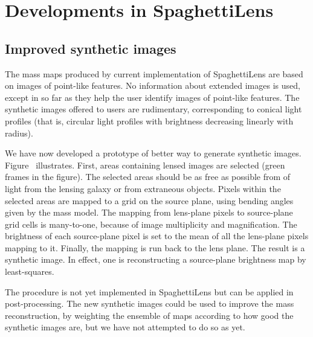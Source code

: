 \section{Developments in SpaghettiLens}

\subsection{Improved synthetic images}\label{subsec:sourcefit}

The mass maps produced by current implementation of SpaghettiLens are
based on images of point-like features.  No information about extended
images is used, except in so far as they help the user identify images
of point-like features.  The synthetic images offered to users are
rudimentary, corresponding to conical light profiles (that is,
circular light profiles with brightness decreasing linearly with radius).

We have now developed a prototype of better way to generate synthetic
images.  Figure~ illustrates.  First, areas
containing lensed images are selected (green frames in the figure).
The selected areas should be as free as possible from of light from
the lensing galaxy or from extraneous objects.  Pixels within the
selected areas are mapped to a grid on the source plane, using bending
angles given by the mass model.  The mapping from lens-plane pixels to
source-plane grid cells is many-to-one, because of image multiplicity
and magnification.  The brightness of each source-plane pixel is set
to the mean of all the lens-plane pixels mapping to it.  Finally, the
mapping is run back to the lens plane.  The result is a synthetic
image.  In effect, one is reconstructing a source-plane brightness map
by least-squares.

The procedure is not yet implemented in SpaghettiLens but can be
applied in post-processing.  The new synthetic images could be used to
improve the mass reconstruction, by weighting the ensemble of maps
according to how good the synthetic images are, but we have not
attempted to do so as yet.

